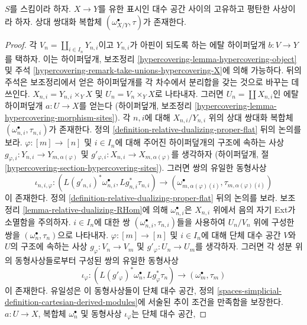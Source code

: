 \begin{lemma}
\label{lemma-existence-relative-dualizing}
$S$를 스킴이라 하자. $X \to Y$를 유한 표시인 대수 공간 사이의
고유하고 평탄한 사상이라 하자. 상대 쌍대화 복합체
$(\omega_{X/Y}^\bullet, \tau)$가 존재한다.
\end{lemma}

\begin{proof}
각 $V_n = \coprod_{i \in I_n} Y_{n, i}$이고 $Y_{n, i}$가 아핀이 되도록
하는 에탈 하이퍼덮개 $b : V \to Y$를 택하자. 이는 하이퍼덮개,
보조정리 \ref{hypercovering-lemma-hypercovering-object} 및 주석
\ref{hypercovering-remark-take-unions-hypercovering-X}에 의해 가능하다.
뒤의 주석은 보조정리에서 얻은 하이퍼덮개를 각 차수에서 분리합을 갖는
것으로 바꾸는 데 쓰인다. $X_{n, i} = Y_{n, i} \times_Y X$ 및
$U_n = V_n \times_Y X$로 나타내자. 그러면
$U_n = \coprod X_{n, i}$인 에탈 하이퍼덮개 $a : U \to X$를 얻는다
(하이퍼덮개, 보조정리
\ref{hypercovering-lemma-hypercovering-morphism-sites}). 각 $n, i$에 대해
$X_{n, i}/Y_{n, i}$ 위의 상대 쌍대화 복합체
$(\omega_{n, i}^\bullet, \tau_{n, i})$가 존재한다. 정의
\ref{definition-relative-dualizing-proper-flat} 뒤의 논의를 보라.
$\varphi : [m] \to [n]$ 및 $i \in I_n$에 대해 주어진 하이퍼덮개의
구조에 속하는 사상
$g_{\varphi, i} : Y_{n, i} \to Y_{m, \alpha(\varphi)}$ 및
$g'_{\varphi, i} : X_{n, i} \to X_{m, \alpha(\varphi)}$를 생각하자
(하이퍼덮개, 절 \ref{hypercovering-section-hypercovering-sites}).
그러면 쌍의 유일한 동형사상
$$
\iota_{n, i, \varphi} :
(L(g'_{n, i})^*\omega_{n, i}^\bullet, Lg_{n, i}^*\tau_{n, i})
\longrightarrow
(\omega_{m, \alpha(\varphi)(i)}^\bullet, \tau_{m, \alpha(\varphi)(i)})
$$
이 존재한다. 정의 \ref{definition-relative-dualizing-proper-flat} 뒤의
논의를 보라. 보조정리 \ref{lemma-relative-dualizing-RHom}에 의해
$\omega_{n, i}^\bullet$은 $X_{n, i}$ 위에서 음의 자기 Ext가 소멸함을
주의하자. $i \in I_n$에 대한 쌍
$(\omega_{n, i}^\bullet, \tau_{n, i})$들을 사용하여 $U_n/V_n$ 위에
구성한 쌍을 $(\omega_n^\bullet, \tau_n)$으로 나타내자.
$\varphi : [m] \to [n]$ 및 $i \in I_n$에 대해 단체 대수 공간 $V$와
$U$의 구조에 속하는 사상 $g_\varphi : V_n \to V_m$ 및
$g'_\varphi : U_n \to U_m$를 생각하자. 그러면 각 성분 위의
동형사상들로부터 구성된 쌍의 유일한 동형사상
$$
\iota_\varphi :
(L(g'_\varphi)^*\omega_n^\bullet, Lg_\varphi^*\tau_n)
\longrightarrow
(\omega_m^\bullet, \tau_m)
$$
이 존재한다. 유일성은 이 동형사상들이 단체 대수 공간, 정의
\ref{spaces-simplicial-definition-cartesian-derived-modules}에 서술된
추이 조건을 만족함을 보장한다. $a : U \to X$, 복합체
$\omega_n^\bullet$ 및 동형사상 $\iota_\varphi$는 단체 대수 공간,

\end{proof}
